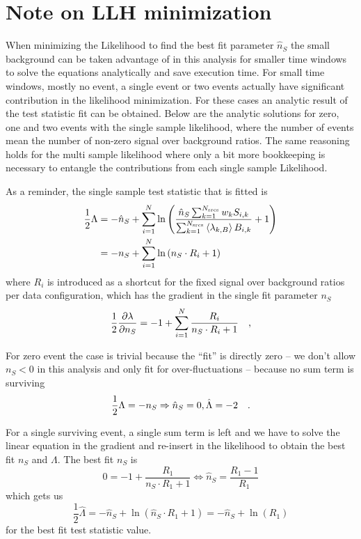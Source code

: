 \section{Note on LLH minimization}
When minimizing the Likelihood to find the best fit parameter $\hat{n}_S$ the small background can be taken advantage of in this analysis for smaller time windows to solve the equations analytically and save execution time.
For small time windows, mostly no event, a single event or two events actually have significant contribution in the likelihood minimization.
For these cases an analytic result of the test statistic fit can be obtained.
Below are the analytic solutions for zero, one and two events with the single sample likelihood, where the number of events mean the number of non-zero signal over background ratios.
The same reasoning holds for the multi sample likelihood where only a bit more bookkeeping is necessary to entangle the contributions from each single sample Likelihood.

As a reminder, the single sample test statistic that is fitted is
\begin{align}
  \frac{1}{2}\Lambda
  &= -\hat{n}_S +
    \sum_{i=1}^N \ln\left(
      \frac{\hat{n}_S \sum_{k=1}^{N_\text{srcs}} w_k S_{i,k}}
           {\sum_{k=1}^{N_\text{srcs}}\Braket{\lambda_{k,B}} B_{i,k}}
      + 1 \right) \\
  &= -n_S + \sum_{i=1}^N \ln\left(n_S \cdot R_i + 1\right)
\end{align}
where $R_i$ is introduced as a shortcut for the fixed signal over background ratios per data configuration, which has the gradient in the single fit parameter $n_S$
\begin{equation}
  \frac{1}{2}\frac{\partial \lambda}{\partial n_S}
  = -1 + \sum_{i=1}^N \frac{R_i}{n_S\cdot R_i + 1} \quad\text{,}
\end{equation}

For zero event the case is trivial because the \enquote{fit} is directly zero -- we don't allow $n_S < 0$ in this analysis and only fit for over-fluctuations -- because no sum term is surviving
\begin{equation}
  \frac{1}{2}\Lambda = -n_S \Rightarrow \hat{n}_S
  = 0, \hat{\Lambda} = -2 \quad\text{.}
\end{equation}

For a single surviving event, a single sum term is left and we have to solve the linear equation in the gradient and re-insert in the likelihood to obtain the best fit $n_S$ and $\Lambda$.
The best fit $n_S$ is
\begin{equation}
  0 = -1 + \frac{R_1}{n_S\cdot R_1 + 1}
    \Leftrightarrow \hat{n}_S = \frac{R_1 - 1}{R_1}
\end{equation}
which gets us
\begin{equation}
  \frac{1}{2}\hat{\Lambda}
    = -\hat{n}_S + \ln\left( \hat{n}_S \cdot R_1 + 1 \right)
    = -\hat{n}_S + \ln(R_1)
\end{equation}
for the best fit test statistic value.

